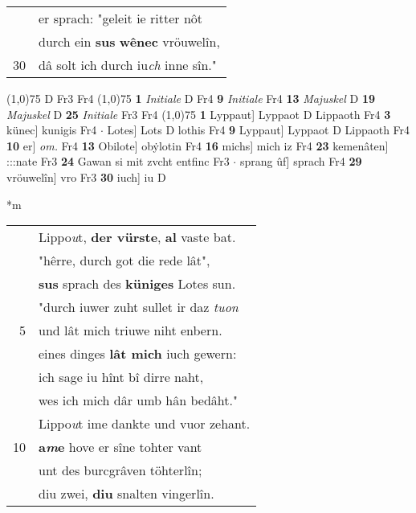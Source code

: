 \documentclass[8pt,a4paper,notitlepage]{article}
\begin{document}
\begin{table}[ht]
\begin{minipage}[t]{0.5\linewidth}
\begin{tabular}{rl}
 & er sprach: "geleit ie ritter nôt\\ 
 & durch ein \textbf{sus} \textbf{wênec} vröuwelîn,\\ 
30 & dâ solt ich durch iu\textit{ch} inne sîn."\\ 
\end{tabular}
\scriptsize
\line(1,0){75} \newline
D Fr3 Fr4 \newline
\line(1,0){75} \newline
\textbf{1} \textit{Initiale} D Fr4  \textbf{9} \textit{Initiale} Fr4  \textbf{13} \textit{Majuskel} D  \textbf{19} \textit{Majuskel} D  \textbf{25} \textit{Initiale} Fr3 Fr4  \newline
\line(1,0){75} \newline
\textbf{1} Lyppaut] Lyppaot D Lippaoth Fr4 \textbf{3} künec] kunigis Fr4  $\cdot$ Lotes] Lots D lothis Fr4 \textbf{9} Lyppaut] Lyppaot D Lippaoth Fr4 \textbf{10} er] \textit{om.} Fr4 \textbf{13} Obilote] obẏlotin Fr4 \textbf{16} michs] mich iz Fr4 \textbf{23} kemenâten] :::nate Fr3 \textbf{24} Gawan si mit zvcht entfinc Fr3  $\cdot$ sprang ûf] sprach Fr4 \textbf{29} vröuwelîn] vro Fr3 \textbf{30} iuch] iu D \newline
\end{minipage}
\hspace{0.5cm}
\begin{minipage}[t]{0.5\linewidth}
\small
\begin{center}*m
\end{center}
\begin{tabular}{rl}
 & Lippo\textit{u}t, \textbf{der vürste}, \textbf{al} vaste bat.\\ 
 & "hêrre, durch got die rede lât",\\ 
 & \textbf{sus} sprach des \textbf{küniges} Lotes sun.\\ 
 & "durch iuwer zuht sullet ir daz \textit{tuon}\\ 
5 & und lât mich triuwe niht enbern.\\ 
 & eines dinges \textbf{lât mich} iuch gewern:\\ 
 & ich sage iu hînt bî dirre naht,\\ 
 & wes ich mich dâr umb hân bedâht."\\ 
 & Lippo\textit{u}t ime dankte und vuor zehant.\\ 
10 & \textbf{a\textit{m}e} hove er sîne tohter vant\\ 
 & unt des burcgrâven töhterlîn;\\ 
 & diu zwei, \textbf{diu} snalten vingerlîn.\\ 

\end{tabular}
\end{minipage}
\end{table}
\end{document}
